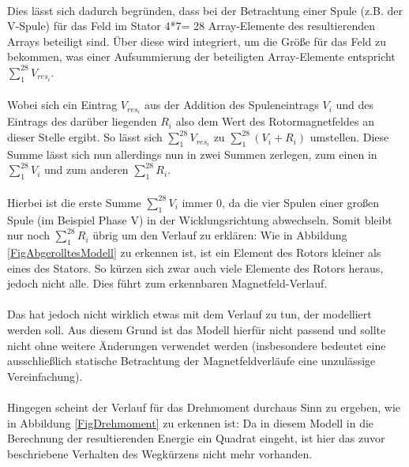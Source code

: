 \paragraph{}
Dies lässt sich dadurch begründen, dass bei der Betrachtung einer Spule (z.B. der V-Spule) für das Feld im Stator 4*7= 28 Array-Elemente des resultierenden Arrays beteiligt sind. Über diese wird integriert, um die Größe für das Feld zu bekommen, was einer Aufsummierung der beteiligten Array-Elemente entspricht $\sum \limits_1^{28} V_{res_i}$. 

\paragraph{}
Wobei sich ein Eintrag $V_{res_i}$ aus der Addition des Spuleneintrags $V_i$ und des Eintrags des darüber liegenden $R_i$ also dem Wert des Rotormagnetfeldes an dieser Stelle ergibt. So lässt sich $\sum \limits_1^{28} V_{res_i}$ zu $\sum \limits_1^{28} (V_i+R_i)$ umstellen. Diese Summe lässt sich nun allerdings nun in zwei Summen zerlegen, zum einen in $\sum \limits_1^{28} V_i$ und zum anderen $\sum \limits_1^{28} R_i$. 

\paragraph{}
Hierbei ist die erste Summe $\sum \limits_1^{28} V_i$ immer 0, da die vier Spulen einer großen Spule (im Beispiel Phase V) in der Wicklungsrichtung abwechseln. 
Somit bleibt nur noch $\sum \limits_1^{28} R_i$ übrig um den Verlauf zu erklären: Wie in Abbildung \ref{FigAbgerolltesModell} zu erkennen ist, ist ein Element des Rotors kleiner als eines des Stators. So kürzen sich zwar auch viele Elemente des Rotors heraus, jedoch nicht alle. Dies führt zum erkennbaren Magnetfeld-Verlauf. 

\paragraph{}
Das hat jedoch nicht wirklich etwas mit dem Verlauf zu tun, der modelliert werden soll. Aus diesem Grund ist das Modell hierfür nicht passend und sollte nicht ohne weitere Änderungen verwendet werden (insbesondere bedeutet eine ausschließlich statische Betrachtung der Magnetfeldverläufe eine unzulässige Vereinfachung).

\paragraph{}
Hingegen scheint der Verlauf für das Drehmoment durchaus Sinn zu ergeben, wie in Abbildung \ref{FigDrehmoment} zu erkennen ist: Da in diesem Modell in die Berechnung der resultierenden Energie ein Quadrat eingeht, ist hier das zuvor beschriebene Verhalten des Wegkürzens nicht mehr vorhanden. 

